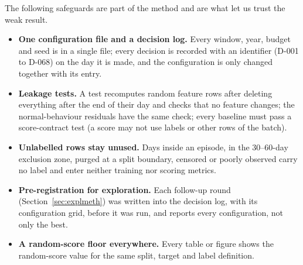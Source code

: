 \documentclass[12pt,a4paper]{article}
\begin{document}
	The following safeguards are part of the method and are what let us trust the weak result.
	\begin{itemize}
		\item \textbf{One configuration file and a decision log.} Every window, year, budget and seed is in a single file; every decision is recorded with an identifier (D-001 to D-068) on the day it is made, and the configuration is only changed together with its entry.
		\item \textbf{Leakage tests.} A test recomputes random feature rows after deleting everything after the end of their day and checks that no feature changes; the normal-behaviour residuals have the same check; every baseline must pass a score-contract test (a score may not use labels or other rows of the batch).
		\item \textbf{Unlabelled rows stay unused.} Days inside an episode, in the 30--60-day exclusion zone, purged at a split boundary, censored or poorly observed carry no label and enter neither training nor scoring metrics.
		\item \textbf{Pre-registration for exploration.} Each follow-up round (Section~\ref{sec:explmeth}) was written into the decision log, with its configuration grid, before it was run, and reports every configuration, not only the best.
		\item \textbf{A random-score floor everywhere.} Every table or figure shows the random-score value for the same split, target and label definition.
	\end{itemize}
\end{document}
